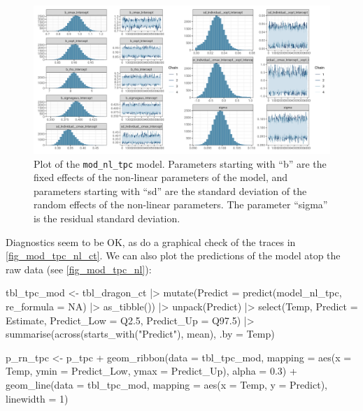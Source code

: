 \documentclass[a4paper,12pt,twoside]{article}
\begin{document}
%
\begin{figure}[t!h!]
  \includegraphics[width = \textwidth]{TPC_nl_model_ct.png}
  \caption{Plot of the \texttt{mod\_nl\_tpc} model. Parameters starting with ``b'' are the fixed effects of the non-linear parameters of the model, and parameters starting with ``sd'' are the standard deviation of the random effects of the non-linear parameters. The parameter ``sigma'' is the residual standard deviation.}
  \label{fig_mod_tpc_nl_ct}
\end{figure}
Diagnostics seem to be OK, as do a graphical check of the traces in \autoref{fig_mod_tpc_nl_ct}. We can also plot the predictions of the model atop the raw data (see \autoref{fig_mod_tpc_nl}):
\begin{Rinput}
tbl_tpc_mod <-
    tbl_dragon_ct |>
    mutate(Predict = predict(model_nl_tpc, re_formula = NA) |>
                     as_tibble()) |>
    unpack(Predict) |>
    select(Temp,
           Predict = Estimate,
           Predict_Low = Q2.5,
           Predict_Up  = Q97.5) |>
    summarise(across(starts_with("Predict"), mean),
              .by = Temp)

p_rn_tpc <-
    p_tpc +
    geom_ribbon(data = tbl_tpc_mod,
                mapping = aes(x = Temp, ymin = Predict_Low, ymax = Predict_Up),
                alpha = 0.3) +
    geom_line(data = tbl_tpc_mod,
              mapping = aes(x = Temp, y = Predict),
              linewidth = 1)
\end{Rinput}
%
\end{document}
